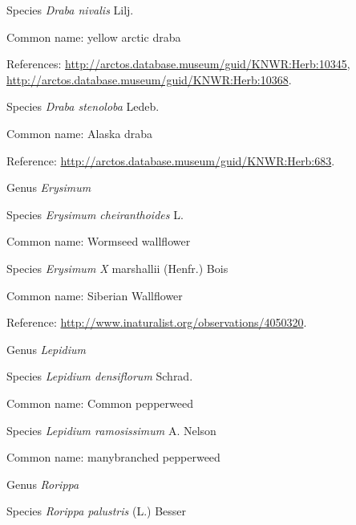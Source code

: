 \documentclass[9pt, article]{memoir}
\begin{document}
\begin{multicols}{2}
\vspace{6pt}\noindent\hspace{36pt}Species \textit{Draba nivalis} Lilj.


Common name: yellow arctic draba

References: 
\url{http://arctos.database.museum/guid/KNWR:Herb:10345}, 
\url{http://arctos.database.museum/guid/KNWR:Herb:10368}.

\vspace{6pt}\noindent\hspace{36pt}Species \textit{Draba stenoloba} Ledeb.


Common name: Alaska draba

Reference: 
\url{http://arctos.database.museum/guid/KNWR:Herb:683}.

\vspace{6pt}\noindent\hspace{30pt}Genus \textit{Erysimum}


\vspace{6pt}\noindent\hspace{36pt}Species \textit{Erysimum cheiranthoides} L.


Common name: Wormseed wallflower

\vspace{6pt}\noindent\hspace{36pt}Species \textit{Erysimum X} marshallii (Henfr.) Bois


Common name: Siberian Wallflower

Reference: 
\url{http://www.inaturalist.org/observations/4050320}.

\vspace{6pt}\noindent\hspace{30pt}Genus \textit{Lepidium}


\vspace{6pt}\noindent\hspace{36pt}Species \textit{Lepidium densiflorum} Schrad.


Common name: Common pepperweed

\vspace{6pt}\noindent\hspace{36pt}Species \textit{Lepidium ramosissimum} A. Nelson


Common name: manybranched pepperweed

\vspace{6pt}\noindent\hspace{30pt}Genus \textit{Rorippa}


\vspace{6pt}\noindent\hspace{36pt}Species \textit{Rorippa palustris} (L.) Besser



\end{multicols}
\end{document}
